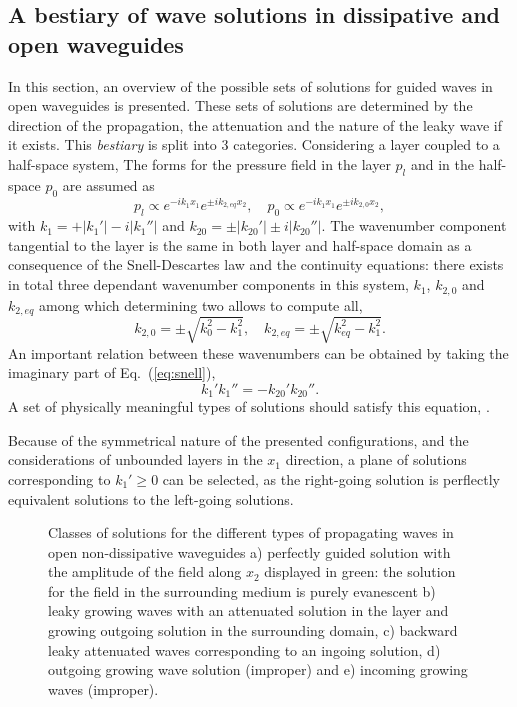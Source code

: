 \subsection{A bestiary of wave solutions in dissipative and open waveguides}
\label{sec:bestiary}

In this section, an overview of the possible sets of solutions for guided waves in open waveguides is presented. These sets of solutions are determined by the direction of the propagation, the attenuation and the nature of the leaky wave if it exists. This \emph{bestiary} is split into 3 categories. Considering a layer coupled to a half-space system, The forms for the pressure field in the layer $p_l$ and in the half-space $p_0$ are assumed as 
\begin{equation}
   p_l \propto e^{-ik_1 x_1} e^{\pm ik_{2,eq} x_2}, \quad p_0 \propto e^{-ik_1 x_1} e^{\pm ik_{2,0} x_2}, 
\end{equation}
with $k_1 = +|k_1'| - i|k_1''|$ and $k_{20} = \pm |k_{20}'| \pm i|k_{20}''|$. The wavenumber component tangential to the layer is the same in both layer and half-space domain as a consequence of the Snell-Descartes law and the continuity equations: there exists in total three dependant wavenumber components in this system, $k_1$, $k_{2,0}$ and $k_{2,eq}$ among which determining two allows to compute all,
\begin{equation}
    k_{2,0} = \pm \sqrt{k_0^2 - k_1^2}, \quad k_{2,eq} = \pm \sqrt{k_{eq}^2 - k_1^2}. 
\end{equation}
An important relation between these wavenumbers can be obtained by taking the imaginary part of Eq.~(\ref{eq:snell}),
\begin{equation}
    k_1'k_1'' = -k_{20}' k_{20}''. 
    \label{eq:treyssedeexpr_disp}
\end{equation} 
A set of physically meaningful types of solutions should satisfy this equation, \cite{treyssede2014}.

Because of the symmetrical nature of the presented configurations, and the considerations of unbounded layers in the $x_1$ direction, a plane of solutions corresponding to $k_1' \geq 0$ can be selected, as the right-going solution is perflectly equivalent solutions to the left-going solutions.  
\begin{figure}[ht]
    \centering
    
    \caption{Classes of solutions for the different types of propagating waves in open non-dissipative waveguides a) perfectly guided solution with the amplitude of the field along $x_2$ displayed in green: the solution for the field in the surrounding medium is purely evanescent b) leaky growing waves with an attenuated solution in the layer and growing outgoing solution in the surrounding domain, c) backward leaky attenuated waves corresponding to an ingoing solution, d) outgoing growing wave solution (improper) and e) incoming growing waves (improper).}
    \label{fig:chap1_classification}
\end{figure}

